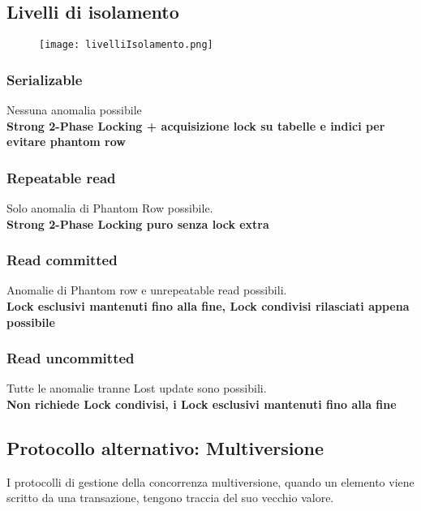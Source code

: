 \break
\subsection{Livelli di isolamento}
\begin{figure}[h!]
    \centering
    \texttt{[image: livelliIsolamento.png]}
    \label{fig:livelliIsolamento}
\end{figure}

\subsubsection{Serializable}
Nessuna anomalia possibile\\
\textbf{Strong 2-Phase Locking + acquisizione lock su tabelle e indici per evitare phantom row}

\subsubsection{Repeatable read}
Solo anomalia di Phantom Row possibile.\\
\textbf{Strong 2-Phase Locking puro senza lock extra}

\subsubsection{Read committed}
Anomalie di Phantom row e unrepeatable read possibili.\\
\textbf{Lock esclusivi mantenuti fino alla fine, Lock condivisi rilasciati appena possibile}

\subsubsection{Read uncommitted}
Tutte le anomalie tranne Lost update sono possibili.\\
\textbf{Non richiede Lock condivisi, i Lock esclusivi mantenuti fino alla fine}

\subsection{Protocollo alternativo: Multiversione}
I protocolli di gestione della concorrenza multiversione, quando un elemento viene scritto da una transazione, tengono traccia del suo vecchio valore.

